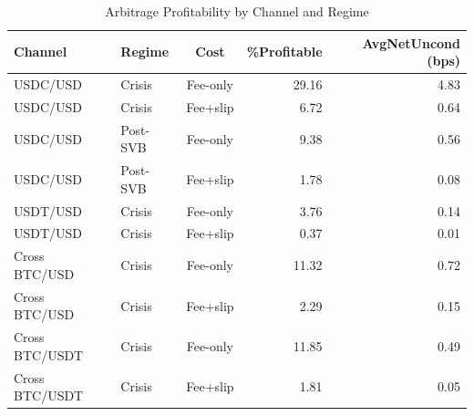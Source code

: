 \begin{table}
\caption{Arbitrage Profitability by Channel and Regime}
\label{tab:arb}
\begin{tabular}{llcrr}
\toprule
Channel & Regime & Cost & \%Profitable & AvgNetUncond (bps) \\
\midrule
USDC/USD & Crisis & Fee-only & 29.16 & 4.83 \\
USDC/USD & Crisis & Fee+slip & 6.72 & 0.64 \\
USDC/USD & Post-SVB & Fee-only & 9.38 & 0.56 \\
USDC/USD & Post-SVB & Fee+slip & 1.78 & 0.08 \\
USDT/USD & Crisis & Fee-only & 3.76 & 0.14 \\
USDT/USD & Crisis & Fee+slip & 0.37 & 0.01 \\
Cross BTC/USD & Crisis & Fee-only & 11.32 & 0.72 \\
Cross BTC/USD & Crisis & Fee+slip & 2.29 & 0.15 \\
Cross BTC/USDT & Crisis & Fee-only & 11.85 & 0.49 \\
Cross BTC/USDT & Crisis & Fee+slip & 1.81 & 0.05 \\
\bottomrule
\end{tabular}
\end{table}
